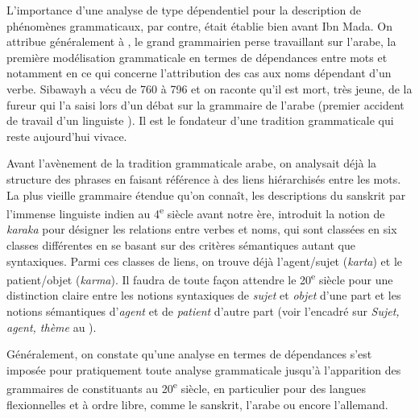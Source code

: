 {    L’importance d’une analyse de type dépendentiel pour la description de phénomènes grammaticaux, par contre, était établie bien avant Ibn Mada. On attribue généralement à , le grand grammairien perse travaillant sur l’arabe, la première modélisation grammaticale en termes de dépendances entre mots et notamment en ce qui concerne l’attribution des cas aux noms dépendant d’un verbe. Sibawayh a vécu de 760 à 796 et on raconte qu’il est mort, très jeune, de la fureur qui l’a saisi lors d’un débat sur la grammaire de l’arabe (premier accident de travail d’un linguiste {\CryingSmiley}
    ). Il est le fondateur d’une tradition grammaticale qui reste aujourd’hui vivace.

    Avant l’avènement de la tradition grammaticale arabe, on analysait déjà la structure des phrases en faisant référence à des liens hiérarchisés entre les mots. La plus vieille grammaire étendue qu’on connaît, les descriptions du sanskrit par l’immense linguiste indien  au 4\textsuperscript{e} siècle avant notre ère, introduit la notion de \textit{karaka} pour désigner les relations entre verbes et noms, qui sont classées en six classes différentes en se basant sur des critères sémantiques autant que syntaxiques. Parmi ces classes de liens, on trouve déjà l’agent/sujet (\textit{karta}) et le patient/objet (\textit{karma}). Il faudra de toute façon attendre le 20\textsuperscript{e} siècle pour une distinction claire entre les notions syntaxiques de \textit{sujet} et \textit{objet} d’une part et les notions sémantiques d’\textit{agent} et de \textit{patient} d’autre part (voir l’encadré sur \textit{Sujet, agent, thème} au ).

    Généralement, on constate qu’une analyse en termes de dépendances s’est imposée pour pratiquement toute analyse grammaticale jusqu’à l’apparition des grammaires de constituants au 20\textsuperscript{e} siècle, en particulier pour des langues flexionnelles et à ordre libre, comme le sanskrit, l’arabe ou encore l’allemand.

}

